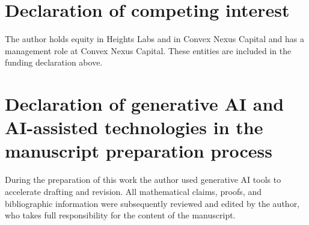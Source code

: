 \documentclass[11pt]{article}
\numberwithin{equation}{section}
\theoremstyle{definition}
\theoremstyle{remark}
\begin{document}
\section*{Declaration of competing interest}
The author holds equity in Heights Labs and in Convex Nexus Capital and has a management role at Convex Nexus Capital. These entities are included in the funding declaration above.

\section*{Declaration of generative AI and AI-assisted technologies in the manuscript preparation process}
During the preparation of this work the author used generative AI tools to accelerate drafting
and revision. All mathematical claims, proofs, and bibliographic information were subsequently
reviewed and edited by the author, who takes full responsibility for the content of the manuscript.

\FloatBarrier
\end{document}
